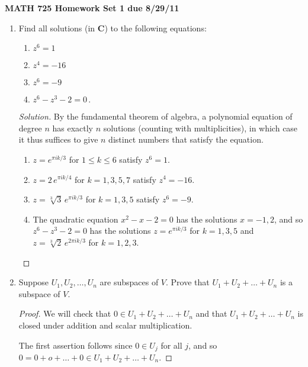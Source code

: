 \documentclass[11pt]{amsart}
\begin{document}
\setlength{\parindent}{0pt}
\setlength{\parskip}{0.4cm}
\thispagestyle{empty} 
\def\C{\mathbf{C}}
\def\F{\mathbf{F}}
\def\R{\mathbf{R}}
\def\Z{\mathbf{Z}}
\def\P{\mathcal{P}}

\begin{center} {\bf MATH 725 \qquad \qquad Homework Set 1 \qquad \qquad due 8/29/11} \end{center} 

\begin{enumerate}[(1)]

\item Find all solutions (in $\C$) to the following equations: 
  \begin{enumerate} 
  \item $z^6 = 1$
  \item $z^4 = -16$
  \item $z^6=-9$
  \item $z^6-z^3-2=0 \, .$
  \end{enumerate}

\begin{proof}[Solution]
By the fundamental theorem of algebra, a polynomial equation of degree $n$ has exactly $n$ solutions (counting with multiplicities), in which case it thus suffices to give $n$ distinct numbers that satisfy the equation.
  \begin{enumerate} 
  \item $z = e^{ \pi i k/3 }$ for $1 \le k \le 6$ satisfy $z^6 = 1$.
  \item $z = 2 \, e^{ \pi i k/4 }$ for $k = 1, 3, 5, 7$ satisfy $z^4 = -16$.
  \item $z = \sqrt[3] 3 \, e^{ \pi i k/3 }$ for $k = 1, 3, 5$ satisfy $z^6=-9$.
  \item The quadratic equation $x^2 - x - 2 = 0$ has the solutions $x = -1, 2$, and so $z^6-z^3-2=0$ has the solutions $z = e^{ \pi i k/3 }$ for $k = 1, 3, 5$ and $z = \sqrt[3] 2 \, e^{ 2 \pi i k/3 }$ for $k = 1, 2, 3$. \qedhere
  \end{enumerate}
\end{proof}

\item Suppose $U_1, U_2, \dots, U_n$ are subspaces of $V$. Prove that $U_1 + U_2 + \dots + U_n$ is a subspace of $V$.

\begin{proof}
We will check that $0 \in U_1 + U_2 + \dots + U_n$ and that $U_1 + U_2 + \dots + U_n$ is closed under addition and scalar multiplication.

The first assertion follows since $0 \in U_j$ for all $j$, and so $0 = 0 + o + \dots + 0 \in U_1 + U_2 + \dots + U_n$.


\end{proof}
\end{enumerate}
\end{document}
